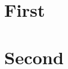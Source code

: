 \documentclass{article}
\begin{document}
\tableofcontents

\newpage

\section{First}

\newpage

\section{Second}
\end{document}
